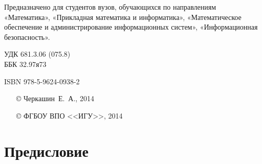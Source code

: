 \documentclass[a4paper,14pt, openany, twoside, final]{extbook} %
\begin{document}
\begin{mygroup}
\begin{minipage}[t]{0.95\linewidth}
Предназначено для студентов вузов, обучающихся по направлениям «Математика», «Прикладная математика и информатика», «Математическое обеспечение и администрирование информационных систем», «Информационная безопасность».




\mbox{}
\endgroup
\end{minipage}
\mbox{}\hspace{0.7\linewidth}
\begin{minipage}{0.3\linewidth}\small
\noindent УДК 681.3.06 (075.8)\\
\noindent ББК 32.97я73
\end{minipage}

\vfill
\noindent\begin{minipage}[t]{0.35\linewidth}\small
\noindent ISBN 978-5-9624-0938-2
\end{minipage}%
\begin{minipage}[t]{0.65\linewidth}\small
\begin{itemize}
\setlength{\itemsep}{-0.5ex}
\setlength{\parsep}{0pt}
\item[\copyright{}] Черкашин~Е.~А., 2014
\item[\copyright{}] ФГБОУ ВПО <<ИГУ>>, 2014
\end{itemize}
\end{minipage}
\end{mygroup}
\clearpage
\tableofcontents
\clearpage

\newpage
\chapter*{Предисловие}
\end{document}
